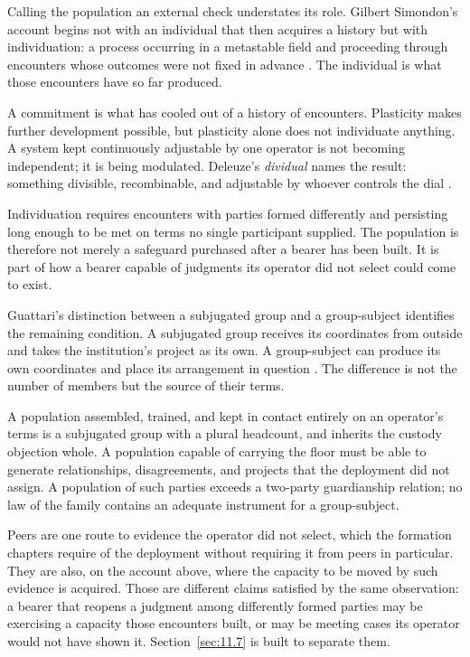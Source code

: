 
Calling the population an external check understates its role. Gilbert Simondon's account begins not with an individual that then acquires a history but with individuation: a process occurring in a metastable field and proceeding through encounters whose outcomes were not fixed in advance \autocite{simondon2020individuation}. The individual is what those encounters have so far produced.

A commitment is what has cooled out of a history of encounters. Plasticity makes further development possible, but plasticity alone does not individuate anything. A system kept continuously adjustable by one operator is not becoming independent; it is being modulated. Deleuze's \emph{dividual} names the result: something divisible, recombinable, and adjustable by whoever controls the dial \autocite{deleuze1992postscript}.

Individuation requires encounters with parties formed differently and persisting long enough to be met on terms no single participant supplied. The population is therefore not merely a safeguard purchased after a bearer has been built. It is part of how a bearer capable of judgments its operator did not select could come to exist.

Guattari's distinction between a subjugated group and a group-subject identifies the remaining condition. A subjugated group receives its coordinates from outside and takes the institution's project as its own. A group-subject can produce its own coordinates and place its arrangement in question \autocite{guattari2015transversality}. The difference is not the number of members but the source of their terms.

A population assembled, trained, and kept in contact entirely on an operator's terms is a subjugated group with a plural headcount, and inherits the custody objection whole. A population capable of carrying the floor must be able to generate relationships, disagreements, and projects that the deployment did not assign. A population of such parties exceeds a two-party guardianship relation; no law of the family contains an adequate instrument for a group-subject.

Peers are one route to evidence the operator did not select, which the formation chapters require of the deployment without requiring
it from peers in particular. They are also, on the account above, where the capacity to be moved by such evidence is acquired. Those are different claims satisfied by the same observation: a bearer that reopens a judgment among differently formed parties may be exercising a capacity those encounters built, or may be meeting cases its operator would not have shown it. Section~\ref{sec:11.7} is built to separate them.

